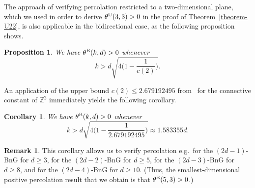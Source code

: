 \documentclass[oneside]{amsart}
\newtheorem{corollary}[theorem]{Corollary}
\newtheorem{prop}[theorem]{Proposition}
\theoremstyle{definition}
\newtheorem{remark}[theorem]{Remark}
\newcommand{\1}{\mathbbm{1}}
\newcommand{\0}{\mathbf{o}}
\newcommand{\Z}{\mathbb{Z}}
\newcommand*{\be}{\begin{equation}}
\newcommand*{\ee}{\end{equation}}
\newcommand{\basc}[1]{{\color{blue}{ \bf [~Bas:\ }\emph{#1}\textbf{~]}}}
\numberwithin{equation}{section}
\begin{document}
The approach of verifying percolation restricted to a two-dimensional plane, which we used in order to derive $\theta^{\rm U}(3,3)>0$ in the proof of Theorem~\ref{theorem-U22}, is also applicable in the bidirectional case, as the following proposition shows.
\begin{prop}\label{prop-Bperc}
We have $\theta^{\rm B}(k,d) > 0$ whenever 
\be 
 k>d\sqrt{4\Big(1-\frac{1}{c(2)}\Big)}.
\ee 
\end{prop}

An application of the upper bound $c(2)\leq 2.679192495$ from~\cite{PonTitt00} for the connective constant of $\Z^2$ immediately yields the following corollary. 

\begin{corollary}\label{cor-Bperc}
We have $\theta^{\rm B}(k,d) > 0$ whenever 
\be 
 k>d\sqrt{4\Big(1-\frac{1}{2.679192495}\Big)}\approx 1.583355
d.
\ee 
\end{corollary}

\begin{remark}
This corollary allows us to verify percolation e.g.\ for the $(2d-1)$-BnG for $d \geq 3$, for the $(2d-2)$-BnG for $d \geq 5$, for the $(2d-3)$-BnG for $d \geq 8$, and for the $(2d-4)$-BnG for $d \geq 10$. (Thus, the smallest-dimensional positive percolation result that we obtain is that $\theta^{\rm B}(5,3) >0$.)
\end{remark}
\end{document}
